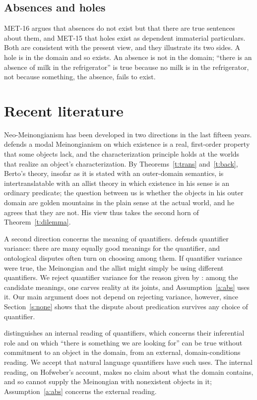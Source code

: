 \documentclass{situationist-preprint}
\begin{document}
\subsection{Absences and holes}

MET-16 argues that absences do not exist but that there are true sentences about them, and MET-15 that holes exist as dependent immaterial particulars. Both are consistent with the present view, and they illustrate its two sides. A hole is in the domain and so exists. An absence is not in the domain; \enquote{there is an absence of milk in the refrigerator} is true because no milk is in the refrigerator, not because something, the absence, fails to exist.

\section{Recent literature}\label{s:recent}

Neo-Meinongianism has been developed in two directions in the last fifteen years. \citet{Berto2013} defends a modal Meinongianism on which existence is a real, first-order property that some objects lack, and the characterization principle holds at the worlds that realize an object's characterization. By Theorems~\ref{t:trans} and~\ref{t:back}, Berto's theory, insofar as it is stated with an outer-domain semantics, is intertranslatable with an allist theory in which existence in his sense is an ordinary predicate; the question between us is whether the objects in his outer domain are golden mountains in the plain sense at the actual world, and he agrees that they are not. His view thus takes the second horn of Theorem~\ref{t:dilemma}.

A second direction concerns the meaning of quantifiers. \citet{Hirsch2011} defends quantifier variance: there are many equally good meanings for the quantifier, and ontological disputes often turn on choosing among them. If quantifier variance were true, the Meinongian and the allist might simply be using different quantifiers. We reject quantifier variance for the reason given by \citet{Sider2011}: among the candidate meanings, one carves reality at its joints, and Assumption~\ref{a:abs} uses it. Our main argument does not depend on rejecting variance, however, since Section~\ref{s:none} shows that the dispute about predication survives any choice of quantifier.

\citet{Hofweber2016} distinguishes an internal reading of quantifiers, which concerns their inferential role and on which \enquote{there is something we are looking for} can be true without commitment to an object in the domain, from an external, domain-conditions reading. We accept that natural language quantifiers have such uses. The internal reading, on Hofweber's account, makes no claim about what the domain contains, and so cannot supply the Meinongian with nonexistent objects in it; Assumption~\ref{a:abs} concerns the external reading.
\end{document}
